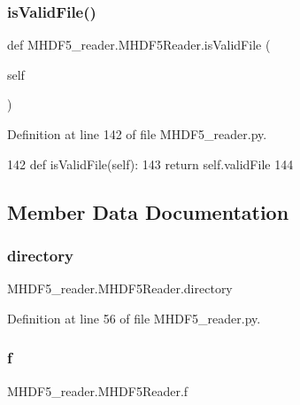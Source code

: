 \subsubsection{\texorpdfstring{is\+Valid\+File()}{isValidFile()}}
{\footnotesize\ttfamily def M\+H\+D\+F5\+\_\+reader.\+M\+H\+D\+F5\+Reader.\+is\+Valid\+File (\begin{DoxyParamCaption}\item[{}]{self }\end{DoxyParamCaption})}



Definition at line 142 of file M\+H\+D\+F5\+\_\+reader.\+py.


\begin{DoxyCode}
142     \textcolor{keyword}{def }isValidFile(self):
143         \textcolor{keywordflow}{return} self.validFile
144                 
\end{DoxyCode}


\subsection{Member Data Documentation}
\mbox{\label{class_m_h_d_f5__reader_1_1_m_h_d_f5_reader_abb791fb16427504bfe7dfa73204747e9}} 
\subsubsection{\texorpdfstring{directory}{directory}}
{\footnotesize\ttfamily M\+H\+D\+F5\+\_\+reader.\+M\+H\+D\+F5\+Reader.\+directory}



Definition at line 56 of file M\+H\+D\+F5\+\_\+reader.\+py.

\mbox{\label{class_m_h_d_f5__reader_1_1_m_h_d_f5_reader_a60187e1fcb12621bc2b2ea884e94bcdf}} 
\subsubsection{\texorpdfstring{f}{f}}
{\footnotesize\ttfamily M\+H\+D\+F5\+\_\+reader.\+M\+H\+D\+F5\+Reader.\+f}



